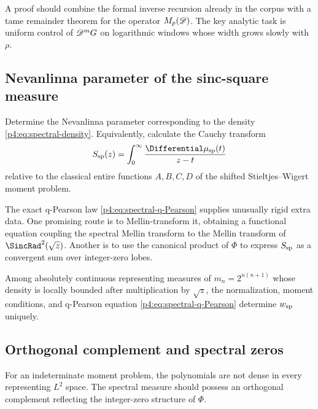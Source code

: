 \documentclass[11pt,oneside]{article}
\theoremstyle{definition}
\theoremstyle{remark}
\begin{document}
A proof should combine the formal inverse recursion already in the corpus with a tame
remainder theorem for the operator $M_p(\mathscr D)$.  The key analytic task is uniform control of
$\mathscr D^mG$ on logarithmic windows whose width grows slowly with $\rho$.

\subsection{Nevanlinna parameter of the sinc-square measure}

\begin{problem}
\label{p4:prob:Nevanlinna}
Determine the Nevanlinna parameter corresponding to the density
\eqref{p4:eq:spectral-density}.  Equivalently, calculate the Cauchy transform
\begin{equation}
 S_{\rm sp}(z)=\int_0^\infty\frac{\Differential\mu_{\rm sp}(t)}{z-t}
 \label{p4:eq:spectral-Stieltjes-transform}
\end{equation}
relative to the classical entire functions $A,B,C,D$ of the shifted
Stieltjes--Wigert moment problem.
\end{problem}

The exact q-Pearson law \eqref{p4:eq:spectral-q-Pearson} supplies unusually rigid extra data.
One promising route is to Mellin-transform it, obtaining a functional equation coupling the
spectral Mellin transform to the Mellin transform of $\SincRad^2(\sqrt z)$.  Another is to use
the canonical product of $\Phi$ to express $S_{\rm sp}$ as a convergent sum over integer-zero
lobes.

\begin{conjecture}
\label{p4:conj:sinc-Pearson-uniqueness}
Among absolutely continuous representing measures of
$m_n=2^{n(n+1)}$ whose density is locally bounded after multiplication by $\sqrt z$, the
normalization, moment conditions, and q-Pearson equation
\eqref{p4:eq:spectral-q-Pearson} determine $w_{\rm sp}$ uniquely.
\end{conjecture}

\subsection{Orthogonal complement and spectral zeros}

For an indeterminate moment problem, the polynomials are not dense in every representing
$L^2$ space.  The spectral measure should possess an orthogonal complement reflecting the
integer-zero structure of $\Phi$.
\end{document}
